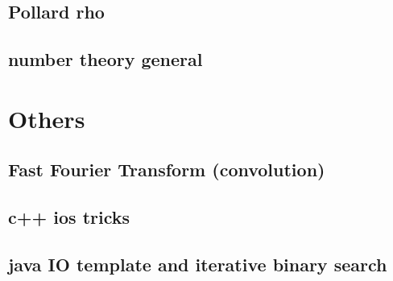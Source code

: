 \subsection{Pollard rho}
\raggedbottom
\hrulefill
\subsection{number theory general}
\raggedbottom
\hrulefill

\section{Others}
\subsection{Fast Fourier Transform (convolution)}
\raggedbottom
\hrulefill
\subsection{c++ ios tricks}
\raggedbottom
\hrulefill
\subsection{java IO template and iterative binary search}
\raggedbottom
\hrulefill

